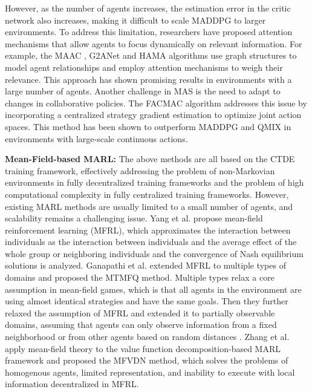 \documentclass[acmsmall]{acmart}
\begin{document}
However, as the number of agents increases, the estimation error in the critic network also increases, making it difficult to scale MADDPG to larger environments. To address this limitation, researchers have proposed attention mechanisms that allow agents to focus dynamically on relevant information. For example, the MAAC \cite{maac}, G2ANet \cite{Liu_Wang_Hu_Hao_Chen_Gao_2020} and HAMA \cite{Ryu_Shin_Park_2020} algorithms use graph structures to model agent relationships and employ attention mechanisms to weigh their relevance. This approach has shown promising results in environments with a large number of agents. Another challenge in MAS is the need to adapt to changes in collaborative policies. 
The FACMAC algorithm \cite{NEURIPS2021_65b9eea6} addresses this issue by incorporating a centralized strategy gradient estimation to optimize joint action spaces. This method has been shown to outperform MADDPG and QMIX in environments with large-scale continuous actions.

\textbf{Mean-Field-based MARL: }
The above methods are all based on the CTDE training framework, effectively addressing the problem of non-Markovian environments in fully decentralized training frameworks and the problem of high computational complexity in fully centralized training frameworks. However, existing MARL methods are usually limited to a small number of agents, and scalability remains a challenging issue. Yang et al. \cite{pmlr-v80-yang18d} propose mean-field reinforcement learning (MFRL), which approximates the interaction between individuals as the interaction between individuals and the average effect of the whole group or neighboring individuals and the convergence of Nash equilibrium solutions is analyzed. Ganapathi et al. \cite{10.5555/3398761.3398813} extended MFRL to multiple types of domains and proposed the MTMFQ method. Multiple types relax a core assumption in mean-field games, which is that all agents in the environment are using almost identical strategies and have the same goals. Then they further relaxed the assumption of MFRL and extended it to partially observable domains, assuming that agents can only observe information from a fixed neighborhood or from other agents based on random distances \cite{10.5555/3463952.3464019}. Zhang et al. \cite{DBLP:conf/ijcai/ZhangY0XL21} apply mean-field theory to the value function decomposition-based MARL framework and proposed the MFVDN method, which solves the problems of homogenous agents, limited representation, and inability to execute with local information decentralized in MFRL.
\end{document}
